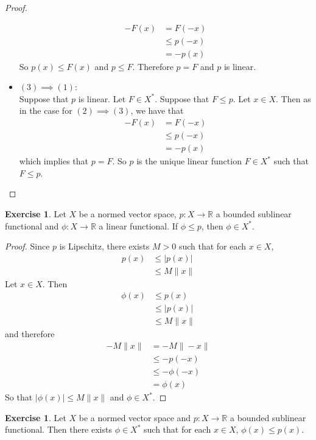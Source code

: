 \documentclass[12pt]{amsart}
\theoremstyle{definition}
\newtheorem{ex}[definition]{Exercise}
\newcommand{\R}{\mathbb{R}}
\newcommand{\lex}[1]{\label{ex:#1}}
\begin{document}
\begin{proof}
\begin{itemize}
\begin{align*}
	-F(x) 
	&= F(-x) \\
	& \leq p(-x) \\
	&= -p(x)
\end{align*}	
	So $p(x) \leq F(x)$ and $p \leq F$. Therefore $p = F$ and $p$ is linear.  
	\item $(3) \implies (1)$: \\ 
	Suppose that $p$ is linear. Let $F \in X^*$. Suppose that $F \leq p$. Let $x \in X$. Then as in the case for $(2) \implies (3)$, we have that
	\begin{align*}
	-F(x) 
	&= F(-x) \\
	& \leq p(-x) \\
	&= -p(x)
	\end{align*}	 
	which implies that $p = F$. So $p$ is the unique linear function $F \in X^*$ such that $F \leq p$.
	\end{itemize}
	\end{proof}
	
	\begin{ex} \lex{}
	Let $X$ be a normed vector space, $p:X \rightarrow \R$ a bounded sublinear functional and $\phi:X \rightarrow \R$ a linear functional. If $\phi \leq p$, then $\phi \in X^*$. 
	\end{ex}
	
	\begin{proof}
	Since $p$ is Lipschitz, there exists $M >0$ such that for each $x \in X$, 
	\begin{align*}
	p(x) 
	&\leq |p(x)| \\
	&\leq M \|x\|
	\end{align*}
	Let $x \in X$. Then 
	\begin{align*}
	\phi(x) 
	&\leq p(x) \\
	&\leq |p(x)| \\
	&\leq M \|x\| 
	\end{align*}
	and therefore  
	\begin{align*}
	- M \|x\| 
	&= -M \|-x\| \\
	& \leq -p(-x) \\
	& \leq - \phi(-x) \\
	&= \phi(x) 
	\end{align*}
	So that $|\phi(x)| \leq  M\|x\|$ and $\phi \in X^*$.
	\end{proof}
	
	\begin{ex} \lex{}
	Let $X$ be a normed vector space and $p:X \rightarrow \R$ a bounded sublinear functional. Then there exists $\phi \in X^*$ such that for each $x \in X$, $\phi(x) \leq p(x)$.
	\end{ex}
	
\end{document}
